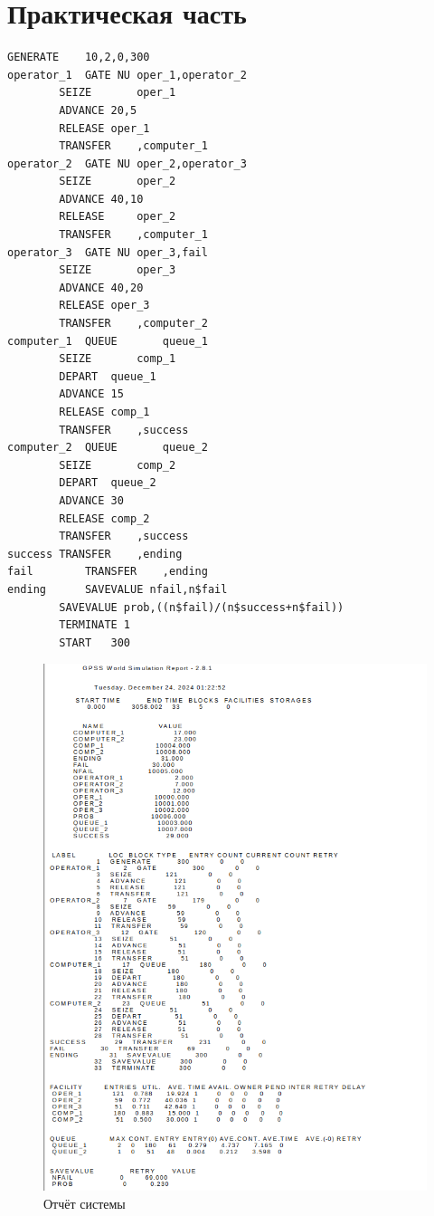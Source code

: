 \section{Практическая часть}

\begin{lstlisting}[caption=Реализация]
		GENERATE 	10,2,0,300
operator_1 	GATE NU	oper_1,operator_2
		SEIZE		oper_1
		ADVANCE	20,5
		RELEASE	oper_1
		TRANSFER	,computer_1
operator_2	GATE NU	oper_2,operator_3
		SEIZE		oper_2
		ADVANCE	40,10
		RELEASE 	oper_2
		TRANSFER	,computer_1
operator_3	GATE NU	oper_3,fail
		SEIZE		oper_3
		ADVANCE	40,20
		RELEASE	oper_3
		TRANSFER	,computer_2
computer_1	QUEUE		queue_1
		SEIZE		comp_1
		DEPART	queue_1
		ADVANCE	15
		RELEASE	comp_1
		TRANSFER	,success
computer_2	QUEUE		queue_2
		SEIZE		comp_2
		DEPART	queue_2
		ADVANCE	30
		RELEASE	comp_2
		TRANSFER	,success
success	TRANSFER	,ending
fail		TRANSFER	,ending
ending		SAVEVALUE nfail,n$fail
		SAVEVALUE prob,((n$fail)/(n$success+n$fail))
		TERMINATE 1
		START 	300
\end{lstlisting}

\clearpage

\begin{figure}[h]
	\centering
	\includegraphics[height=0.9\textheight]{../img/res.png}
	\caption{Отчёт системы}
	\label{plt:even_comp_alg}
\end{figure}


